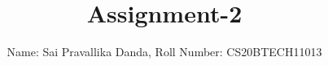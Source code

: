 \documentclass[journal,12pt,twocolumn]{IEEEtran}
\DeclareMathOperator*{\Res}{Res}
\begin{document}
\newcommand{\BEQA}{\begin{eqnarray}}
\newcommand{\EEQA}{\end{eqnarray}}
\newcommand{\define}{\stackrel{\triangle}{=}}

\raggedbottom
\setlength{\parindent}{0pt}
\providecommand{\mbf}{\mathbf}
\providecommand{\pr}[1]{\ensuremath{\Pr\left(#1\right)}}
\providecommand{\qfunc}[1]{\ensuremath{Q\left(#1\right)}}
\providecommand{\sbrak}[1]{\ensuremath{{}\left[#1\right]}}
\providecommand{\lsbrak}[1]{\ensuremath{{}\left[#1\right.}}
\providecommand{\rsbrak}[1]{\ensuremath{{}\left.#1\right]}}
\providecommand{\brak}[1]{\ensuremath{\left(#1\right)}}
\providecommand{\lbrak}[1]{\ensuremath{\left(#1\right.}}
\providecommand{\rbrak}[1]{\ensuremath{\left.#1\right)}}
\providecommand{\cbrak}[1]{\ensuremath{\left\{#1\right\}}}
\providecommand{\lcbrak}[1]{\ensuremath{\left\{#1\right.}}
\providecommand{\rcbrak}[1]{\ensuremath{\left.#1\right\}}}
\theoremstyle{remark}
\newtheorem{rem}{Remark}
\newcommand{\sgn}{\mathop{\mathrm{sgn}}}
\providecommand{\abs}[1]{\vert#1\vert}
\providecommand{\res}[1]{\Res\displaylimits_{#1}} 
\providecommand{\norm}[1]{\lVert#1\rVert}
\providecommand{\mtx}[1]{\mathbf{#1}}
\providecommand{\mean}[1]{E[ #1 ]}
\providecommand{\fourier}{\overset{\mathcal{F}}{ \rightleftharpoons}}
\providecommand{\system}{\overset{\mathcal{H}}{ \longleftrightarrow}}
\newcommand{\solution}{\noindent \textbf{Solution: }}
\newcommand{\cosec}{\,\text{cosec}\,}
\providecommand{\dec}[2]{\ensuremath{\overset{#1}{\underset{#2}{\gtrless}}}}
\newcommand{\myvec}[1]{\ensuremath{\begin{pmatrix}#1\end{pmatrix}}}
\newcommand{\mydet}[1]{\ensuremath{\begin{vmatrix}#1\end{vmatrix}}}
\makeatletter
{}
\makeatother
\let\StandardTheFigure\thefigure
\let\vec\mathbf
\renewcommand{\thefigure}{\theproblem}
\def\putbox#1#2#3{\makebox[0in][l]{\makebox[#1][l]{}\raisebox{\baselineskip}[0in][0in]{\raisebox{#2}[0in][0in]{#3}}}}
     \def\rightbox#1{\makebox[0in][r]{#1}}
     \def\centbox#1{\makebox[0in]{#1}}
     \def\topbox#1{\raisebox{-\baselineskip}[0in][0in]{#1}}
     \def\midbox#1{\raisebox{-0.5\baselineskip}[0in][0in]{#1}}
\vspace{3cm}
\title{Assignment-2}
\author{Name: Sai Pravallika Danda, Roll Number: CS20BTECH11013}
\end{document}
